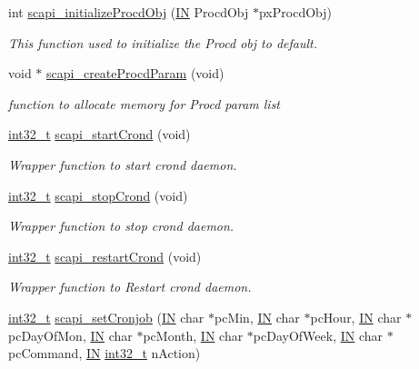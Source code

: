 \begin{DoxyCompactItemize}
int \hyperlink{group__LIBSCAPI_ga25df7b3956934b110ea0596aefee803d}{scapi\-\_\-initialize\-Procd\-Obj} (\hyperlink{group__LIBHELP_gac2bbd6d630a06a980d9a92ddb9a49928}{I\-N} Procd\-Obj $\ast$px\-Procd\-Obj)
\begin{DoxyCompactList}\small\item\em This function used to initialize the Procd obj to default. \end{DoxyCompactList}\item 
void $\ast$ \hyperlink{group__LIBSCAPI_ga5d1fae8311998344b32130a904886732}{scapi\-\_\-create\-Procd\-Param} (void)
\begin{DoxyCompactList}\small\item\em function to allocate memory for Procd param list \end{DoxyCompactList}\item 
\hyperlink{commondefs_8h_a32f2e37ee053cf2ce8ca28d1f74630e5}{int32\-\_\-t} \hyperlink{group__LIBSCAPI_gaf70610523fb08f08924d3e09b050d3e3}{scapi\-\_\-start\-Crond} (void)
\begin{DoxyCompactList}\small\item\em Wrapper function to start crond daemon. \end{DoxyCompactList}\item 
\hyperlink{commondefs_8h_a32f2e37ee053cf2ce8ca28d1f74630e5}{int32\-\_\-t} \hyperlink{group__LIBSCAPI_ga5b3df75bbd9125de226ca44482d63e88}{scapi\-\_\-stop\-Crond} (void)
\begin{DoxyCompactList}\small\item\em Wrapper function to stop crond daemon. \end{DoxyCompactList}\item 
\hyperlink{commondefs_8h_a32f2e37ee053cf2ce8ca28d1f74630e5}{int32\-\_\-t} \hyperlink{group__LIBSCAPI_ga3984100e53609ea9aba1ded81f9bb476}{scapi\-\_\-restart\-Crond} (void)
\begin{DoxyCompactList}\small\item\em Wrapper function to Restart crond daemon. \end{DoxyCompactList}\item 
\hyperlink{commondefs_8h_a32f2e37ee053cf2ce8ca28d1f74630e5}{int32\-\_\-t} \hyperlink{group__LIBSCAPI_ga49ce95cc0f908512851b5b37ac23bf8e}{scapi\-\_\-set\-Cronjob} (\hyperlink{group__LIBHELP_gac2bbd6d630a06a980d9a92ddb9a49928}{I\-N} char $\ast$pc\-Min, \hyperlink{group__LIBHELP_gac2bbd6d630a06a980d9a92ddb9a49928}{I\-N} char $\ast$pc\-Hour, \hyperlink{group__LIBHELP_gac2bbd6d630a06a980d9a92ddb9a49928}{I\-N} char $\ast$pc\-Day\-Of\-Mon, \hyperlink{group__LIBHELP_gac2bbd6d630a06a980d9a92ddb9a49928}{I\-N} char $\ast$pc\-Month, \hyperlink{group__LIBHELP_gac2bbd6d630a06a980d9a92ddb9a49928}{I\-N} char $\ast$pc\-Day\-Of\-Week, \hyperlink{group__LIBHELP_gac2bbd6d630a06a980d9a92ddb9a49928}{I\-N} char $\ast$pc\-Command, \hyperlink{group__LIBHELP_gac2bbd6d630a06a980d9a92ddb9a49928}{I\-N} \hyperlink{commondefs_8h_a32f2e37ee053cf2ce8ca28d1f74630e5}{int32\-\_\-t} n\-Action)

\end{DoxyCompactItemize}
